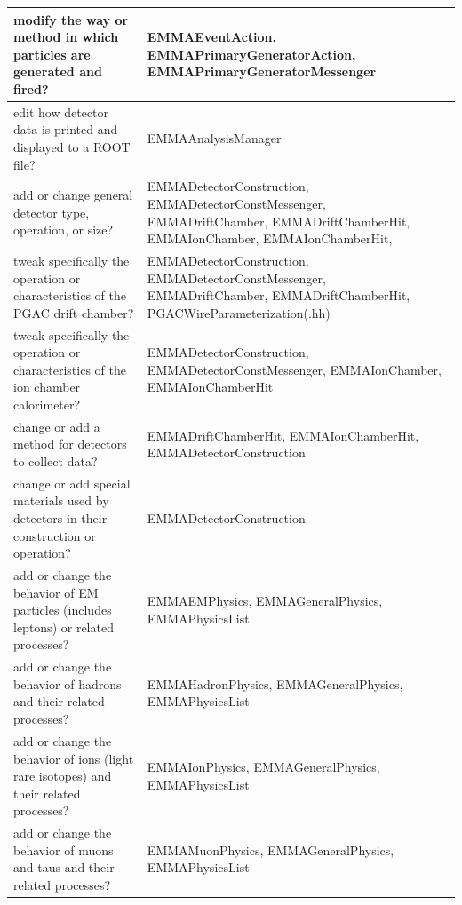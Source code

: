 \documentclass{article}
\begin{document}
\begin{longtable}[c]{|p{6 cm}|p{6 cm}|}
modify the way or method in which particles are generated and fired?                                   & EMMAEventAction, EMMAPrimaryGeneratorAction, EMMAPrimaryGeneratorMessenger                                                       \\ \hline
edit how detector data is printed and displayed to a ROOT file?                                        & EMMAAnalysisManager                                                                                                              \\ \hline
add or change general detector type, operation, or size?                                               & EMMADetectorConstruction, EMMADetectorConstMessenger, EMMADriftChamber, EMMADriftChamberHit, EMMAIonChamber, EMMAIonChamberHit,  \\ \hline
tweak specifically the operation or characteristics of the PGAC drift chamber?                         & EMMADetectorConstruction, EMMADetectorConstMessenger, EMMADriftChamber, EMMADriftChamberHit, PGACWireParameterization(.hh)       \\ \hline
tweak specifically the operation or characteristics of the ion chamber calorimeter?                    & EMMADetectorConstruction, EMMADetectorConstMessenger, EMMAIonChamber, EMMAIonChamberHit                                          \\ \hline
change or add a method for detectors to collect data?                                                  & EMMADriftChamberHit, EMMAIonChamberHit, EMMADetectorConstruction                                                                 \\ \hline
change or add special materials used by detectors in their construction or operation?                  & EMMADetectorConstruction                                                                                                         \\ \hline
add or change the behavior of EM particles (includes leptons) or related processes?                    & EMMAEMPhysics, EMMAGeneralPhysics, EMMAPhysicsList                                                                               \\ \hline
add or change the behavior of hadrons and their related processes?                                     & EMMAHadronPhysics, EMMAGeneralPhysics, EMMAPhysicsList                                                                           \\ \hline
add or change the behavior of ions (light rare isotopes) and their related processes?                  & EMMAIonPhysics, EMMAGeneralPhysics, EMMAPhysicsList                                                                              \\ \hline
add or change the behavior of muons and taus and their related processes?                              & EMMAMuonPhysics, EMMAGeneralPhysics, EMMAPhysicsList                                                                             \\ 
\hline
\end{longtable}
\end{document}
